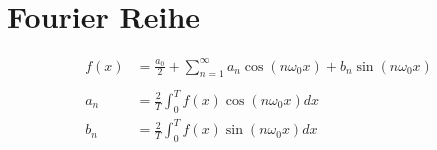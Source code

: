 \section{Fourier Reihe}

\begin{align*}
f(x) &=\frac{a_{0}}{2} + \sum_{n=1}^{\infty}{a_{n}\cos{(n\omega_{0}x)}+b_{n}\sin{(n\omega_{0}x)}}\\ \\
a_{n} &= \frac{2}{T}\int_{0}^{T}{f(x)\cos{(n\omega_{0}x)}dx}\\
b_{n} &= \frac{2}{T}\int_{0}^{T}{f(x)\sin{(n\omega_{0}x)}dx}\\
\end{align*}

